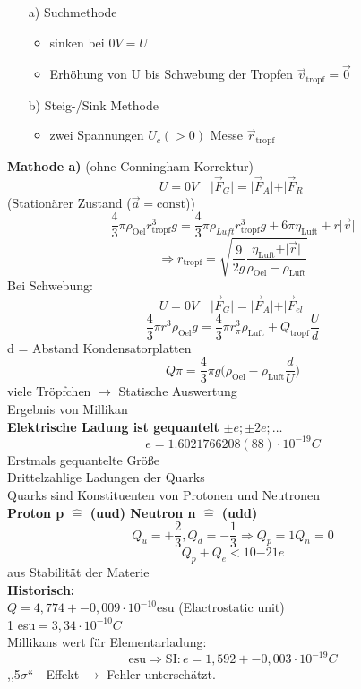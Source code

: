 \documentclass[titlepage,12pt,a4paper,ngerman]{report}
\newcommand{\tx}[1]{\textrm{#1}}
\begin{document}
\begin{itemize}
\item[a)] Suchmethode
\begin{itemize}
\item sinken bei $0V= U$
\item Erhöhung von U bis Schwebung der Tropfen $\vec{v}_{\textrm{tropf}} = \vec{0}$
\end{itemize}
\item[b)] Steig-/Sink Methode
\begin{itemize}
\item zwei Spannungen $U_c(>0)$ Messe $\vec{r}_{\tx{tropf}}$
\end{itemize}
\end{itemize}
\textbf{Mathode a)} (ohne Conningham Korrektur)\\
$$U = 0V \quad \vert \vec{F}_G \vert = \vert \vec{F}_A \vert + \vert \vec{F}_R \vert$$ (Stationärer Zustand ($\vec{a} = \tx{const}$))
$$\frac{4}{3} \pi \rho_{\tx{Oel}} r^3_{\tx{tropf}} g = \frac{4}{3} \pi \rho_{Luft} r_{\tx{tropf}}^3 g + 6 \pi \eta_{\tx{Luft}} + r \vert \vec{v} \vert$$
$$\Rightarrow r_{\tx{tropf}} = \sqrt{\frac{9}{2g} \frac{\eta_{\tx{Luft}} + \vert \vec{r} \vert }{\rho_{\tx{Oel}}-\rho_{\tx{Luft}}}}$$
Bei Schwebung:
$$U = 0V \quad \vert \vec{F}_G \vert = \vert \vec{F}_A \vert + \vert \vec{F}_{el} \vert$$
$$\frac{4}{3} \pi r^3 \rho_{\tx{Oel}} g = \frac{4}{3} \pi r^3_{\pi} \rho_{\tx{Luft}} + Q_{\tx{tropf}} \frac{U}{d}$$
 d = Abstand Kondensatorplatten
$$Q\pi = \frac{4}{3}	\pi g  \bigg( \rho_{\tx{Oel}}-\rho_{\tx{Luft}} \frac{d}{U}\bigg)$$
viele Tröpfchen $\rightarrow$ Statische Auswertung\\
Ergebnis von Millikan \\
\textbf{Elektrische Ladung ist gequantelt} $\pm e;\pm2e;\dots$
$$e = 1.6021766208(88) \cdot 10^{-19} C$$
Erstmals gequantelte Größe\\
Drittelzahlige Ladungen der Quarks\\
Quarks sind Konstituenten von Protonen und Neutronen\\
\textbf{Proton p $\widehat{=}$ (uud) Neutron n $\widehat{=} $ (udd)}
$$Q_u = + \frac{2}{3}, Q_d = - \frac{1}{3} \Rightarrow Q_p = 1 Q_n = 0$$
$$Q_p + Q_e < 10{-21} e$$ aus Stabilität der Materie\\
\textbf{Historisch:}\\
$Q = 4,774 +- 0,009 \cdot 10^{-10}$esu (Elactrostatic unit)\\
1 esu$ = 3,34 \cdot 10^{-10} C$\\
Millikans wert für Elementarladung: $$ \textrm{esu} \Rightarrow \textrm{SI}: e = 1,592 +- 0,003 \cdot 10 ^{-19} C$$
,,5$\sigma$`` - Effekt $\rightarrow$ Fehler unterschätzt.
\end{document}
